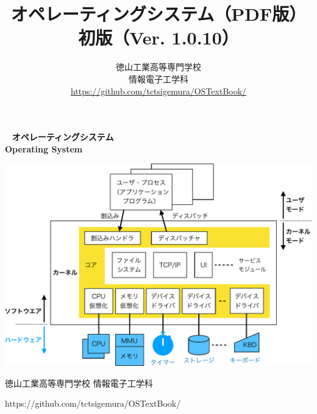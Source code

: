 \documentclass[a4paper,11pt,twocolumn]{ltjsbook}     %
\newif\ifPDF
\newcommand{\pdf}{（PDF版）}
\newcommand{\pdf}{}
\newcommand{\edition}{初版}
\newcommand{\ver}{Ver. 1.0.10}
\begin{document}
\setcounter{page}{0}
\thispagestyle{empty}
\onecolumn
~
\vfill
\vfill
{\noindent
\fontsize{34pt}{50pt}\selectfont\textbf{オペレーティングシステム}\\
\fontsize{34pt}{50pt}\selectfont\textbf{Operating System}
}
\vfill
\vfill
\centerline{
  \includegraphics[scale=0.77]{Fig/osOrganization-crop.pdf}
}
\vfill
\vfill
\centerline{\Large 徳山工業高等専門学校 情報電子工学科}
\centerline{\Large\ttfamily https://github.com/tctsigemura/OSTextBook/}
\vfill

\ifPDF
\newpage
\setcounter{page}{0}
\thispagestyle{empty}
\onecolumn
~
\fi

\frontmatter
\title{オペレーティングシステム{\pdf}\\{\edition}（{\ver}）}
\author{徳山工業高等専門学校\\情報電子工学科\\
\url{https://github.com/tctsigemura/OSTextBook/}}
\date{}
\maketitle
\end{document}
